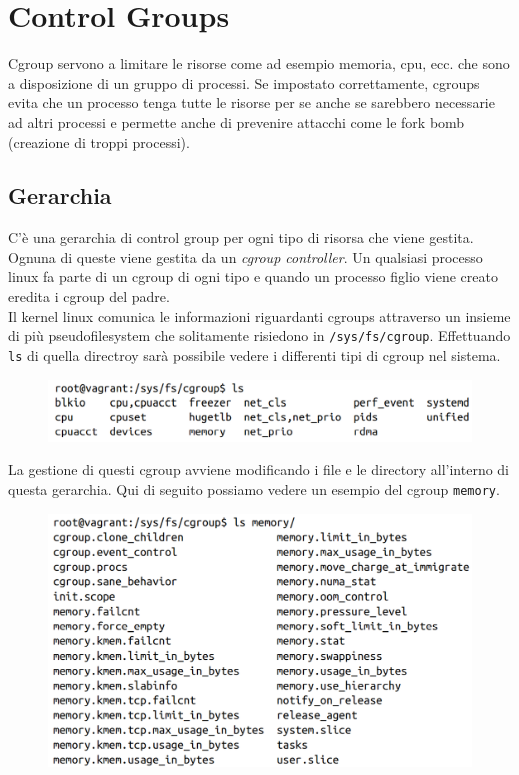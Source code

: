 \chapter{Control Groups}

Cgroup servono a limitare le risorse come ad esempio memoria, cpu, ecc. che sono
a disposizione di un gruppo di processi. Se impostato correttamente, cgroups
evita che un processo tenga tutte le risorse per se anche se sarebbero necessarie
ad altri processi e permette anche di prevenire attacchi come le fork bomb
(creazione di troppi processi).

\section{Gerarchia}

C'è una gerarchia di control group per ogni tipo di risorsa che viene gestita.
Ognuna di queste viene gestita da un \textit{cgroup controller}.
Un qualsiasi processo linux fa parte di un cgroup di ogni tipo e quando un
processo figlio viene creato eredita i cgroup del padre.\\

Il kernel linux comunica le informazioni riguardanti cgroups attraverso un insieme
di più pseudofilesystem che solitamente risiedono in \verb|/sys/fs/cgroup|.
Effettuando \verb|ls| di quella directroy sarà possibile vedere i differenti
tipi di cgroup nel sistema.

\begin{figure}[H]
    \centering
    \includegraphics[width=\textwidth, keepaspectratio]{capitoli/os_security/imgs/cgroup1.png}
\end{figure}

La gestione di questi cgroup avviene modificando i file e le directory all'interno
di questa gerarchia. Qui di seguito possiamo vedere un esempio
del cgroup \verb|memory|.

\begin{figure}[H]
    \centering
    \includegraphics[width=\textwidth, keepaspectratio]{capitoli/os_security/imgs/cgroup2.png}
\end{figure}

